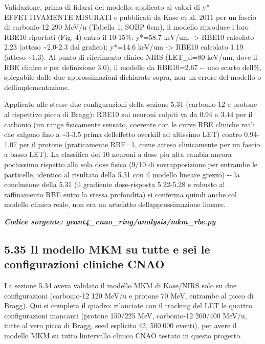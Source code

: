 \documentclass[
  italian,
]{article}
\begin{document}
Validazione, prima di fidarsi del modello: applicato ai valori di y* EFFETTIVAMENTE MISURATI e pubblicati da Kase et al. 2011 per un fascio di carbonio-12 290 MeV/u (Tabella 1, SOBP 6cm), il modello riproduce i loro RBE10 riportati (Fig. 4) entro il 10-15\%: y*=58.7 keV/um -\textgreater{} RBE10 calcolato 2.23 (atteso \textasciitilde2.0-2.3 dal grafico); y*=14.6 keV/um -\textgreater{} RBE10 calcolato 1.19 (atteso \textasciitilde1.3). Al punto di riferimento clinico NIRS (LET\_\allowbreak{}d=80 keV/um, dove il RBE clinico e\textquotesingle{} per definizione 3.0), il modello da\textquotesingle{} RBE10=2.67 -\/- uno scarto dell\%, spiegabile dalle due approssimazioni dichiarate sopra, non un errore del modello o dell\textquotesingle implementazione.

Applicato alle stesse due configurazioni della sezione 5.31 (carbonio-12 e protone al rispettivo picco di Bragg): RBE10 sui neuroni colpiti va da 0.94 a 3.44 per il carbonio (un range fisicamente sensato, coerente con le curve RBE cliniche reali che salgono fino a \textasciitilde3-3.5 prima dell\textquotesingle effetto overkill ad altissimo LET) contro 0.94-1.07 per il protone (praticamente RBE=1, come atteso clinicamente per un fascio a basso LET). La classifica dei 10 neuroni a dose piu\textquotesingle{} alta cambia ancora pochissimo rispetto alla sola dose fisica (9/10 di sovrapposizione per entrambe le particelle, identico al risultato della 5.31 con il modello lineare grezzo) -\/- la conclusione della 5.31 (il gradiente dose-risposta 5.22-5.28 e\textquotesingle{} robusto al raffinamento RBE entro la stessa profondita\textquotesingle) si conferma quindi anche col modello clinico reale, non era un artefatto dell\textquotesingle approssimazione lineare.

\textit{\textbf{Codice sorgente: geant4\_\allowbreak{}cnao\_\allowbreak{}ring/analysis/mkm\_\allowbreak{}rbe.py}}


\subsection{5.35 Il modello MKM su tutte e sei le configurazioni cliniche CNAO}\label{il-modello-mkm-su-tutte-e-sei-le-configurazioni-cliniche-cnao}

La sezione 5.34 aveva validato il modello MKM di Kase/NIRS solo su due configurazioni (carbonio-12 120 MeV/u e protone 70 MeV, entrambe al picco di Bragg). Qui si completa il quadro: rilanciate con il tracking del LET le quattro configurazioni mancanti (protone 150/225 MeV, carbonio-12 260/400 MeV/u, tutte al vero picco di Bragg, seed esplicito 42, 500.000 eventi), per avere il modello MKM su tutto l\textquotesingle intervallo clinico CNAO testato in questo progetto.
\end{document}
